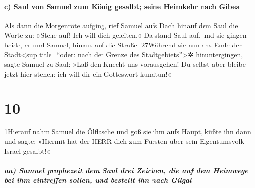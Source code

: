 \hypertarget{c-saul-von-samuel-zum-kuxf6nig-gesalbt-seine-heimkehr-nach-gibea}{%
\paragraph{c) Saul von Samuel zum König gesalbt; seine Heimkehr nach
Gibea}\label{c-saul-von-samuel-zum-kuxf6nig-gesalbt-seine-heimkehr-nach-gibea}}

Als dann die Morgenröte aufging, rief Samuel aufs Dach hinauf dem Saul
die Worte zu: »Stehe auf! Ich will dich geleiten.« Da stand Saul auf,
und sie gingen beide, er und Samuel, hinaus auf die Straße. 27Während
sie nun ans Ende der Stadt\textless sup title=``oder: nach der Grenze
des Stadtgebiets''\textgreater✲ hinuntergingen, sagte Samuel zu Saul:
»Laß den Knecht uns vorausgehen! Du selbst aber bleibe jetzt hier
stehen: ich will dir ein Gotteswort kundtun!«

\hypertarget{section-9}{%
\section{10}\label{section-9}}

1Hierauf nahm Samuel die Ölflasche und goß sie ihm aufs Haupt, küßte ihn
dann und sagte: »Hiermit hat der HERR dich zum Fürsten über sein
Eigentumsvolk Israel gesalbt!«

\hypertarget{aa-samuel-prophezeit-dem-saul-drei-zeichen-die-auf-dem-heimwege-bei-ihm-eintreffen-sollen-und-bestellt-ihn-nach-gilgal}{%
\subparagraph{aa) Samuel prophezeit dem Saul drei Zeichen, die auf dem
Heimwege bei ihm eintreffen sollen, und bestellt ihn nach
Gilgal}\label{aa-samuel-prophezeit-dem-saul-drei-zeichen-die-auf-dem-heimwege-bei-ihm-eintreffen-sollen-und-bestellt-ihn-nach-gilgal}}

